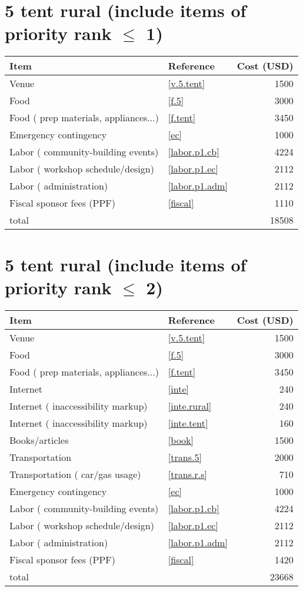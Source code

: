 \section*{5 tent rural (include items of priority rank $\leq$ 1)}
\begin{center}
\begin{tabular}{llr}
Item & Reference & Cost (USD) \\ \hline
Venue & \ref{v.5.tent} & 1500 \\
Food & \ref{f.5} & 3000 \\
Food ( prep materials, appliances...) & \ref{f.tent} & 3450 \\
Emergency contingency & \ref{ec} & 1000 \\
Labor ( community-building events) & \ref{labor.p1.cb} & 4224 \\
Labor ( workshop schedule/design) & \ref{labor.p1.ec} & 2112 \\
Labor ( administration) & \ref{labor.p1.adm} & 2112 \\
Fiscal sponsor fees (PPF) & \ref{fiscal} & 1110 \\ \hline
total &  & 18508
\end{tabular}
\end{center}
\newpage
\section*{5 tent rural (include items of priority rank $\leq$ 2)}
\begin{center}
\begin{tabular}{llr}
Item & Reference & Cost (USD) \\ \hline
Venue & \ref{v.5.tent} & 1500 \\
Food & \ref{f.5} & 3000 \\
Food ( prep materials, appliances...) & \ref{f.tent} & 3450 \\
Internet & \ref{inte} & 240 \\
Internet ( inaccessibility markup) & \ref{inte.rural} & 240 \\
Internet ( inaccessibility markup) & \ref{inte.tent} & 160 \\
Books/articles & \ref{book} & 1500 \\
Transportation & \ref{trans.5} & 2000 \\
Transportation ( car/gas usage) & \ref{trans.r.s} & 710 \\
Emergency contingency & \ref{ec} & 1000 \\
Labor ( community-building events) & \ref{labor.p1.cb} & 4224 \\
Labor ( workshop schedule/design) & \ref{labor.p1.ec} & 2112 \\
Labor ( administration) & \ref{labor.p1.adm} & 2112 \\
Fiscal sponsor fees (PPF) & \ref{fiscal} & 1420 \\ \hline
total &  & 23668
\end{tabular}
\end{center}
\newpage
